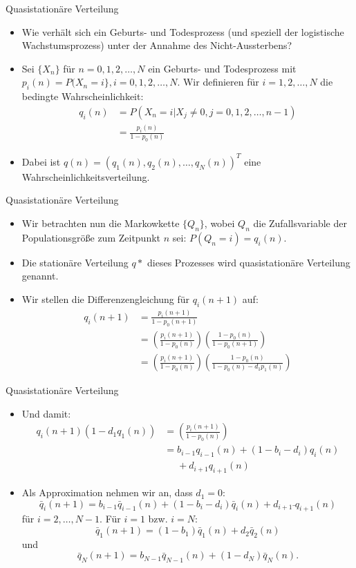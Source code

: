 \documentclass{beamer}
\newcommand\relphantom[1]{\mathrel{\phantom{#1}}}
\begin{document}
\begin{frame}{Quasistationäre Verteilung}
  \begin{itemize}
  \item Wie verhält sich ein Geburts- und Todesprozess (und speziell der logistische Wachstumsprozess) unter der Annahme des Nicht-Aussterbens?
  \item Sei $\{X_n\}$ für $n = 0,1,2,\dots,N$ ein Geburts- und Todesprozess mit $p_i(n) = P(X_n=i\}, i = 0,1,2,\dots,N$. Wir definieren für $i = 1,2,\dots,N$ die bedingte Wahrscheinlichkeit:
    \begin{align*}
      q_i(n) &= P(X_n=i|X_j \neq 0, j = 0,1,2,\dots,n-1) \\
             &= \frac{p_i(n)}{1-p_0(n)}
    \end{align*}
  \item Dabei ist $q(n) = (q_1(n),q_2(n), \dots, q_N(n))^T$ eine Wahrscheinlichkeitsverteilung.
  \end{itemize}
\end{frame}
\begin{frame}{Quasistationäre Verteilung}
  \begin{itemize}
  \item Wir betrachten nun die Markowkette $\{Q_n\}$, wobei $Q_n$ die Zufallsvariable der Populationsgröße zum Zeitpunkt $n$ sei: $P(Q_n = i) = q_i(n)$.
  \item Die stationäre Verteilung $q*$ dieses Prozesses wird quasistationäre Verteilung genannt.
  \item Wir stellen die Differenzengleichung für $q_i(n+1)$ auf:
    \begin{align*}
      q_i(n+1) &= \frac{p_i(n+1)}{1-p_0(n+1)} \\
               &= \left(\frac{p_i(n+1)}{1-p_0(n)}\right)\left(\frac{1-p_0(n)}{1-p_0(n+1)}\right) \\
               &= \left(\frac{p_i(n+1)}{1-p_0(n)}\right)\left(\frac{1-p_0(n)}{1-p_0(n)-d_1p_1(n)}\right)
    \end{align*}
  \end{itemize}
\end{frame}
\begin{frame}{Quasistationäre Verteilung}
  \begin{itemize}
  \item Und damit:
    \begin{align*}
      q_i(n+1)(1-d_1q_1(n)) &= \left(\frac{p_i(n+1)}{1-p_0(n)}\right) \\
                            &= b_{i-1}q_{i-1}(n) + (1-b_i-d_i)q_i(n) \\
                            &\relphantom{=}{} + d_{i+1}q_{i+1}(n)
    \end{align*}
   \item Als Approximation nehmen wir an, dass $d_1 = 0$:
     \[
       \bar{q}_i(n+1) = b_{i-1}\bar{q}_{i-1}(n) + (1 - b_i - d_i)\bar{q}_i(n) + d_{i+1}\bar{~}{q}_{i+1}(n)
     \]
     für $i = 2,\dots, N-1$. Für $i = 1$ bzw{.} $i = N$:
     \[
       \bar{q}_1(n+1) = (1 - b_1)\bar{q}_1(n) + d_2\bar{q}_2(n)
     \]
     und
     \[
       \bar{q}_N(n+1) = b_{N-1}\bar{q}_{N-1}(n) + (1-d_N)\bar{q}_N(n).
     \]
  \end{itemize}
\end{frame}
\end{document}
